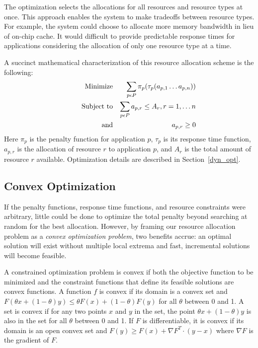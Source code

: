 The optimization selects the allocations for all resources and resource types at once.  This approach enables the system to make tradeoffs between resource types.  For example, the system could choose to allocate more memory bandwidth in lieu of on-chip cache.  It would difficult to provide predictable response times for applications considering the allocation of only one resource type at a time.

A succinct mathematical characterization of this resource allocation scheme is the following:
\begin{eqnarray*}
& \makebox[1in][r]{Minimize}   & \sum_{p\epsilon P} {\pi_p(\tau_p(a_{p,1}\ldots a_{p,n}))}  \\
& \makebox[1in][r]{Subject to} & \sum_{p\epsilon P} a_{p,r} \leq A_r, r = 1,\ldots n        \\
& \makebox[1in][r]{and}        & a_{p,r} \geq 0
\end{eqnarray*}
Here $\pi_p$ is the penalty function for application $p$,
$\tau_p$ is its response time function,
$a_{p,r}$ is the allocation of resource $r$ to application $p$,
and $A_r$ is the total amount of resource $r$ available.  Optimization details are described in Section~\ref{dyn_opt}.

\subsection*{Convex Optimization}

If the penalty functions, response time functions, and resource constraints were arbitrary,
little could be done to optimize the total penalty beyond searching at random for the best allocation.
However, by framing our resource allocation problem as a \emph{convex optimization problem}\cite{BoVa},
two benefits accrue: an optimal solution will exist without multiple local extrema and
fast, incremental solutions will become feasible.

A constrained optimization problem is convex if both the objective function to be minimized
and the constraint functions that define its feasible solutions are convex functions.
A function $f$ is convex if its domain is a convex set and
$F(\theta x + (1-\theta)y) \leq \theta F(x) + (1-\theta)F(y)$
for all $\theta$ between 0 and 1.
A set is convex if for any two points $x$ and $y$ in the set, the point
$\theta x + (1-\theta)y$
is also in the set for all $\theta$ between 0 and 1.
If $F$ is differentiable, it is convex if its domain is an open convex set and
$F(y) \geq F(x) + \nabla F^T\cdot(y-x)$ where $\nabla F$ is the gradient of $F$.

